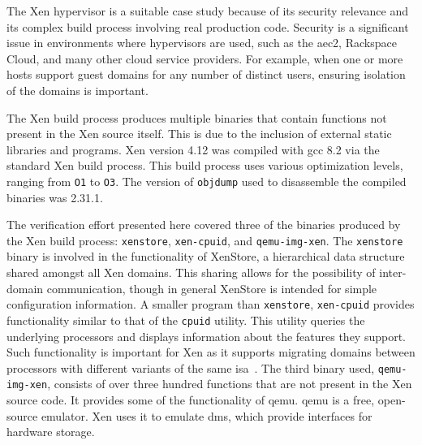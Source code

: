 The Xen hypervisor is a suitable case study because of its security relevance
and its complex build process involving real production code.
Security is a significant issue in environments where hypervisors are used,
such as the \ac{aec2}, Rackspace Cloud, and many other cloud service providers.
For example, when one or more hosts support guest domains
for any number of distinct users,
ensuring isolation of the domains is important.

The Xen build process produces multiple binaries
that contain functions not present in the Xen source itself.
This is due to the inclusion of external static libraries and programs.
Xen version 4.12 was compiled with \ac{gcc} 8.2 via the standard Xen build process.
This build process uses various optimization levels, ranging from \texttt{O1} to \texttt{O3}.
The version of \texttt{objdump} used to disassemble the compiled binaries
was 2.31.1.

The verification effort presented here
covered three of the binaries produced by the Xen build process:
\lstinline|xenstore|, \lstinline|xen-cpuid|, and \lstinline|qemu-img-xen|.
The \lstinline|xenstore| binary is involved in the functionality of
XenStore,
a hierarchical data structure shared amongst all Xen domains.
This sharing allows for the possibility of inter-domain communication,
though in general XenStore is intended for simple configuration information.
A smaller program than \lstinline|xenstore|, \lstinline|xen-cpuid|
provides functionality similar to that of the
\lstinline|cpuid| utility.
This utility queries the underlying processors
and displays information about the features they support.
Such functionality is important for Xen
as it supports migrating domains
between processors with different variants of the same \ac{isa}~\citep{cpuid-masking}.
The third binary used, \lstinline|qemu-img-xen|,
consists of over three hundred functions
that are not present in the Xen source code.
It provides some of the functionality of \ac{qemu}.
\Ac{qemu} is a free, open-source emulator.
Xen uses it to emulate \acp{dm}, which provide interfaces for hardware storage.


